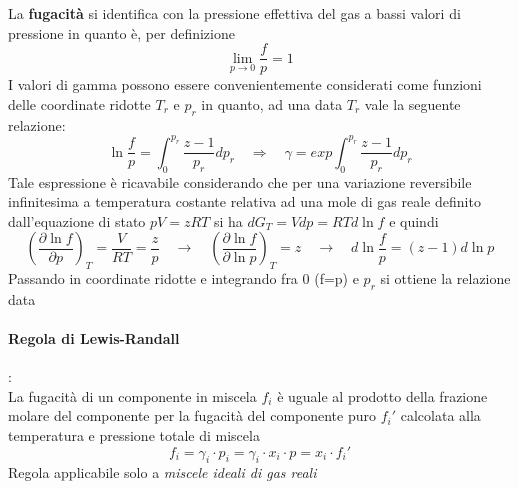 \documentclass{article}
\newcommand{\so}{\quad \rightarrow \quad}
\newcommand{\So}{\quad \Rightarrow \quad}
\begin{document}
La \textbf{fugacità} si identifica con la pressione effettiva del gas a bassi valori di pressione in quanto è, per definizione
\begin{equation*}
    \lim_{p\to0}\frac{f}{p}=1
\end{equation*}
I valori di \gls{gamma} possono essere convenientemente considerati come funzioni delle coordinate ridotte $T_r$ e $p_r$ in quanto, ad una data $T_r$ vale la seguente relazione:
\begin{equation*}
    \ln\frac{f}{p}=\int_0^{p_r}\frac{z-1}{p_r}dp_r \So \gamma=exp \int_0^{p_r}\frac{z-1}{p_r}dp_r
\end{equation*}
Tale espressione è ricavabile considerando che per una variazione reversibile infinitesima a temperatura costante relativa ad una mole di gas reale definito dall'equazione di stato $pV=zRT$ si ha $dG_T=Vdp=RTd\ln f$ e quindi
\begin{equation*}
    (\frac{\partial\ln f}{\partial p})_T=\frac{V}{RT}=\frac{z}{p} \so  (\frac{\partial\ln f}{\partial \ln p})_T=z \so d\ln \frac{f}{p}=(z-1)d\ln p
\end{equation*}
Passando in coordinate ridotte e integrando fra 0 (f=p) e $p_r$ si ottiene la relazione data

\paragraph{Regola di Lewis-Randall}:\\
La fugacità di un componente in miscela $f_i$ è uguale al prodotto della frazione molare del componente per la fugacità del componente puro $f_i'$ calcolata alla temperatura e pressione totale di miscela
\begin{equation*}
    f_i=\gamma_i\cdot p_i=\gamma_i\cdot x_i \cdot p=x_i\cdot f_i'
\end{equation*}
Regola applicabile solo a \textit{miscele ideali di gas reali}
\end{document}
